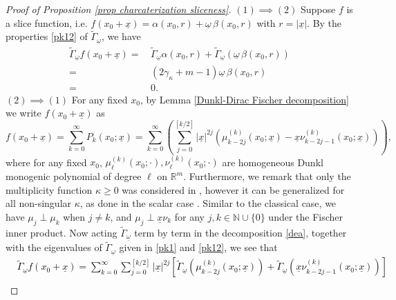 \documentclass{amsart}
\theoremstyle{definition}
\theoremstyle{remark}
\numberwithin{equation}{section}
\begin{document}
\begin{proof}[Proof of Proposition \ref{prop charcaterization sliceness}]
  $(1)\implies (2)$ Suppose $f$ is a slice function, i.e. $f(x_{0}+\underline{x})=\alpha(x_0,r)+\underline\omega\,\beta(x_0,r)$ with $r=|\underline{x}|$.  By the properties \eqref{pk12} of $\widetilde{\Gamma}_{\underline\omega}$, we have
    \begin{equation*}
    \begin{split}
\widetilde{\Gamma}_{\underline\omega}f(x_{0}+\underline{x})=&\,\widetilde{\Gamma}_{\underline\omega}\alpha(x_0,r)+\widetilde{\Gamma}_{\underline\omega}(\underline\omega\, \beta(x_0,r))\\=&\,(2 \gamma_{\kappa}+m-1)\underline\omega\,\beta(x_0,r)\\=&\,0.
    \end{split}
    \end{equation*}
$(2)\implies (1)$
For any fixed $x_{0}$, by Lemma \ref{Dunkl-Dirac Fischer decomposition} we  write $f(x_{0}+\underline{x})$ as
    \begin{equation} \label{dea}
        f(x_{0}+\underline x)=\sum_{k=0}^\infty P_{k}(x_0;\underline x)=\sum_{k=0}^\infty \left(\sum_{j=0}^{[k/2]}|\underline x|^{2j}(\mu^{(k)}_{k-2j}(x_0;\underline x)-\underline x \nu^{(k)}_{k-2j-1}(x_0;\underline x))\right),
    \end{equation}
    where for any fixed $x_0$, $\mu^{(k)}_\ell(x_0;\cdot),\nu^{(k)}_\ell(x_0;\cdot)$ are homogeneous Dunkl monogenic polynomial of degree $\ell$ on $\mathbb{R}^{m}$. 
  Furthermore, we remark that only the multiplicity function $\kappa\ge 0$ was considered in \cite{oss}, however it can be generalized for all non-singular $\kappa$, as done in the  scalar case \cite{ddo}. Similar to the classical case, we have  $\mu_{j}\perp \mu_{k}$ when $j\neq k$, and $\mu_{j}\perp \underline{x}\nu_{k}$ for any $j, k\in \mathbb{N}\cup\{0\}$ under the Fischer inner product. Now acting  $\widetilde{\Gamma}_{\underline\omega}$ term by term in the decomposition \eqref{dea}, together with the eigenvalues  of
    $\widetilde{\Gamma}_{\underline\omega}$ given in   \eqref{pk1} and \eqref{pk12},
     we see that
     \textcolor{black}{
     \begin{equation*}
    \begin{split}
    & \widetilde{\Gamma}_{\underline\omega}f(x_0+\underline{x})=\sum_{k=0}^{\infty}\sum_{j=0}^{[k/2]}|\underline{x}|^{2j}\left[\widetilde\Gamma_{\underline\omega}\left(\mu^{(k)}_{k-2j}(x_0;\underline x)\right)+\widetilde\Gamma_{\underline\omega}\left(\underline x\nu^{(k)}_{k-2j-1}(x_0;\underline x)\right)\right]\\

\end{split}
\end{equation*}}
\end{proof}
\end{document}
